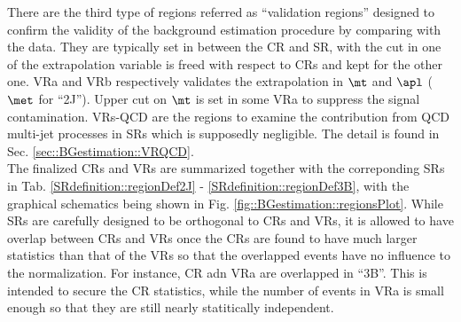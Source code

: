 There are the third type of regions referred as ``validation regions'' designed to confirm the validity of the background estimation procedure by comparing with the data. They are typically set in between the CR and SR, with the cut in one of the extrapolation variable is freed with respect to CRs and kept for the other one. VRa and VRb respectively validates the extrapolation in $\mt$ and $\apl$ ($\met$ for ``2J''). Upper cut on $\mt$ is set in some VRa to suppress the signal contamination. VRs-QCD are the regions to examine the contribution from QCD multi-jet processes in SRs which is supposedly negligible. The detail is found in Sec. \ref{sec::BGestimation::VRQCD}. \\

The finalized CRs and VRs are summarized together with the correponding SRs in Tab. \ref{SRdefinition::regionDef2J} - \ref{SRdefinition::regionDef3B}, with the graphical schematics being shown in Fig. \ref{fig::BGestimation::regionsPlot}. While SRs are carefully designed to be orthogonal to CRs and VRs, it is allowed to have overlap between CRs and VRs once the CRs are found to have much larger statistics than that of the VRs so that the overlapped events have no influence to the normalization. For instance, CR adn VRa are overlapped in ``3B''. This is intended to secure the CR statistics, while the number of events in VRa is small enough so that they are still nearly statitically independent. \\
\clearpage

